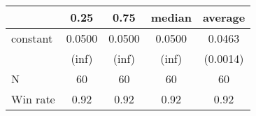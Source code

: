 \begin{tabular}{lcccc}
\hline
         &  0.25  &  0.75  & median & average   \\
\midrule
\midrule
constant & 0.0500 & 0.0500 & 0.0500 & 0.0463    \\
         & (inf)  & (inf)  & (inf)  & (0.0014)  \\
N        & 60     & 60     & 60     & 60        \\
Win rate & 0.92   & 0.92   & 0.92   & 0.92      \\
\hline
\end{tabular}